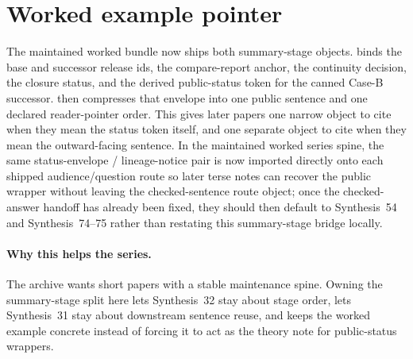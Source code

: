 \documentclass[11pt]{article}
\begin{document}
\section{Worked example pointer}
The maintained worked bundle now ships both summary-stage objects.\cite{series:workedexample}
 binds the base and successor release ids, the compare-report anchor, the continuity decision, the closure status, and the derived public-status token for the canned Case-B successor.
 then compresses that envelope into one public sentence and one declared reader-pointer order.
This gives later papers one narrow object to cite when they mean the status token itself, and one separate object to cite when they mean the outward-facing sentence. In the maintained worked series spine, the same status-envelope / lineage-notice pair is now imported directly onto each shipped audience/question route so later terse notes can recover the public wrapper without leaving the checked-sentence route object; once the checked-answer handoff has already been fixed, they should then default to Synthesis~54 and Synthesis~74--75 rather than restating this summary-stage bridge locally.\cite{series:challengeanswerreviewmenus,series:pairedterminalcitationdiscipline,series:pairedterminalcutoverrules}

\paragraph{Why this helps the series.}
The archive wants short papers with a stable maintenance spine.
Owning the summary-stage split here lets Synthesis~32 stay about stage order, lets Synthesis~31 stay about downstream sentence reuse, and keeps the worked example concrete instead of forcing it to act as the theory note for public-status wrappers.
\end{document}
